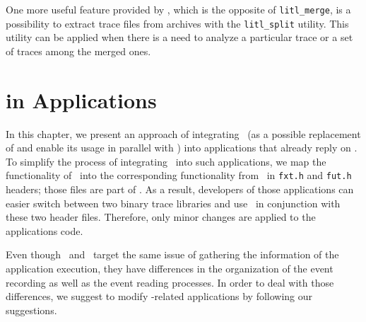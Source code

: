 One more useful feature provided by \litl{}, which is the opposite of 
\texttt{litl\_merge}, is a possibility to extract trace files from archives 
with the \texttt{litl\_split} utility. This utility can be applied when there is 
a need to analyze a particular trace or a set of traces among the merged ones.

\begin{landscape}

\end{landscape}  


\chapter{\litl{} in \fxt{} Applications}
In this chapter, we present an approach of integrating \litl\ (as a possible 
replacement of \fxt{} and enable its usage in parallel with \fxt) into 
applications that already reply on \fxt{}. To simplify the process of 
integrating \litl\ into such applications, we map the functionality of 
\litl\ into the corresponding functionality from \fxt\ in \texttt{fxt.h} and 
\texttt{fut.h} headers; those files are part of \litl. As a result, developers 
of those applications can easier switch between two binary trace libraries and
use \litl\ in conjunction with these two header files. Therefore, only minor
changes are applied to the applications code.

Even though \litl\ and \fxt\ target the same issue of gathering the 
information of the application execution, they have differences in the 
organization of the event recording as well as the event reading processes. In 
order to deal with those differences, we suggest to modify \fxt-related 
applications by following our suggestions.

